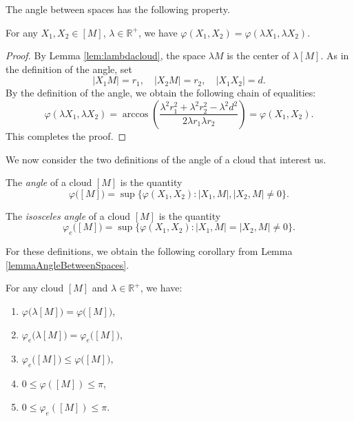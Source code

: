 The angle between spaces has the following property.
\begin{lemma}
  \label{lemmaAngleBetweenSpaces} For any \( X_1, X_2 \in [M] \), \( \lambda
  \in\mathbb{R}^+ \), we have \( \varphi (X_1, X_2) = \varphi (\lambda
      X_1,
  \lambda X_2) \).
\end{lemma}
\begin{proof}
  By Lemma \ref{lem:lambdacloud}, the space \( \lambda M \) is the
  center of \( \lambda
    [M]
  \). As in the definition of the angle, set \[ |X_1 M| = r_1,\quad
    | X_2 M | =r_2,\quad
    |X_1
  X_2| = d.\] By the definition of the angle, we obtain the following chain
  of equalities: \[ \varphi (\lambda X_1, \lambda X_2) =
    \arccos\left(\frac{\lambda
      ^{2} r_1^2 + \lambda ^2 r_2^2 - \lambda^2 d^2}{2 \lambda  r_1
    \lambda r_2}\right) =
    \varphi (X_1, X_2).
  \]
  This completes the proof.
\end{proof}
We now consider the two definitions of the angle of a cloud that interest us.
\begin{definition}
  The \emph{angle} of a cloud \( [M] \) is the quantity
  \[
    \varphi \big([M]\big)= \sup \big\{\varphi (X_1, X_2) \colon | X_1,M
    |, |X_2,M| \neq 0\big\}.
  \]
\end{definition}
\begin{definition}
  The \emph{isosceles angle} of a cloud \( [M] \) is the quantity
  \[
    \varphi_e \big([M]\big) = \sup \big\{\varphi (X_1, X_2) \colon |X_1,M |
    = |X_2,M| \neq 0\big\}.
  \]
\end{definition}
For these definitions, we obtain the following corollary from Lemma
\ref{lemmaAngleBetweenSpaces}.
\begin{lemma}
  For any cloud \( [M] \) and \( \lambda \in\mathbb{R}^+ \), we
  have:
  \label{lem:angles}
  \begin{enumerate}
    \item \(\varphi \big(\lambda [M]\big) = \varphi
      \big([M]\big)\),\label{lem:angles:1}
    \item \(\varphi_e \big(\lambda [M]\big) = \varphi_e
      \big([M]\big)\),\label{lem:angles:2}
    \item \( \varphi_e \big([M]\big) \le \varphi \big([M]\big)
      \),\label{lem:angles:3}
    \item \(0 \le \varphi ([M]) \le \pi\),\label{lem:angles:4}
    \item \(0 \le \varphi_e ([M]) \le \pi\).\label{lem:angles:5}
  \end{enumerate}
\end{lemma}

